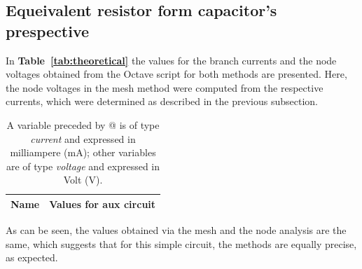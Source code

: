 \subsection{Equeivalent resistor form capacitor's prespective} 




In \textbf{Table~\ref{tab:theoretical}} the values for the branch currents and the node voltages obtained from the Octave script for both methods are presented. Here, the node voltages in the mesh method were computed from the respective currents, which were determined as described in the previous subsection.
 \pagebreak 
\begin{table}[h]
  \centering
  \begin{tabular}{|l|r|}
    \hline    
    {\bf Name} & {\bf Values for aux circuit}\\ \hline
    
  \end{tabular}
  \caption{A variable preceded by @ is of type {\em current}
    and expressed in milliampere (mA); other variables are of type {\it voltage} and expressed in
    Volt (V).}
  \label{tab:equivalent resistor}
\end{table}


As can be seen, the values obtained via the mesh and the node analysis are the same, which suggests that for this simple circuit, the methods are equally precise, as expected.





